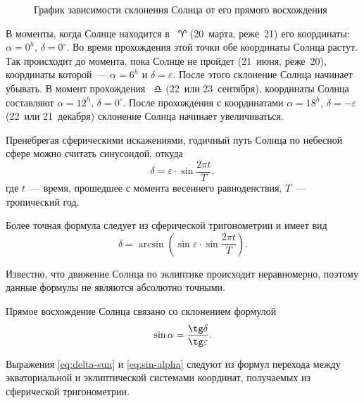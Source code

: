 \begin{wrapfigure}[12]{r}{0.5\tw}
    \centering
    \vspace{-.9pc}
    \caption{График зависимости склонения Солнца от его прямого восхождения}
\end{wrapfigure}
В моменты, когда Солнце находится в ~$\aries$  (20~марта, реже~21) его координаты: $\alpha=0^h$, $\delta=0^{\circ}$. Во время прохождения этой точки обе координаты Солнца растут. Так происходит до момента, пока Солнце не пройдет  (21~июня, реже~20), координаты которой~--- $\alpha=6^h$ и $\delta=\varepsilon$. После этого склонение Солнца начинает убывать. В момент прохождения ~$\libra$ (22~или 23~сентября), координаты Солнца составляют $\alpha=12^h$, $\delta=0^{\circ}$. После прохождения  с координатами $\alpha=18^h$, $\delta=-\varepsilon$ (22~или 21~декабря) склонение Солнца начинает увеличиваться.

Пренебрегая сферическими искажениями, годичный путь Солнца по небесной сфере можно считать синусоидой, откуда
\begin{equation}
    \delta=\varepsilon\cdot\sin \frac{2 \pi t}{T},
\end{equation}
где $t$~--- время, прошедшее с момента весеннего равноденствия, $T$~--- тропический год.

Более точная формула следует из сферической тригонометрии и имеет вид
\begin{equation}
    \delta=\arcsin\left(\sin\varepsilon\cdot\sin \frac{2 \pi t}{T}\right).
    \label{eq:delta-sun}
\end{equation}

Известно, что движение Солнца по эклиптике происходит неравномерно, поэтому данные формулы не являются абсолютно точными.

Прямое восхождение Солнца связано со склонением формулой
\begin{equation}
    \sin\alpha=\frac{\tg\delta}{\tg\varepsilon}.
    \label{eq:sin-alpha}
\end{equation}

Выражения \eqref{eq:delta-sun} и \eqref{eq:sin-alpha} следуют из формул перехода между экваториальной и эклиптической системами координат, получаемых из сферической тригонометрии.
